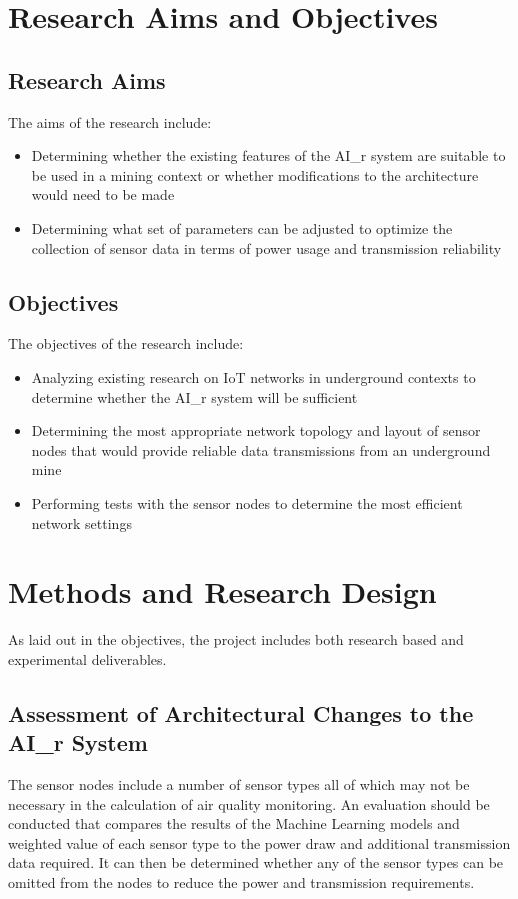 \documentclass[a4paper,twoside,12pt]{report}
\begin{document}
\section{Research Aims and Objectives}

\subsection{Research Aims}
The aims of the research include:
\begin{itemize}
    \item Determining whether the existing features of the AI\_r system are suitable to be used in a mining context or whether modifications to the architecture would need to be made
    \item Determining what set of parameters can be adjusted to optimize the collection of sensor data in terms of power usage and transmission reliability
\end{itemize}

\subsection{Objectives}
The objectives of the research include:
\begin{itemize}
    \item Analyzing existing research on IoT networks in underground contexts to determine whether the AI\_r system will be sufficient
    \item Determining the most appropriate network topology and layout of sensor nodes that would provide reliable data transmissions from an underground mine
    \item Performing tests with the sensor nodes to determine the most efficient network settings
\end{itemize}

\section{Methods and Research Design}
As laid out in the objectives, the project includes both research based and experimental deliverables.

\subsection{Assessment of Architectural Changes to the AI\_r System}
The sensor nodes include a number of sensor types all of which may not be necessary in the calculation of air quality monitoring. An evaluation should be conducted that compares the results of the Machine Learning models and weighted value of each sensor type to the power draw and additional transmission data required. It can then be determined whether any of the sensor types can be omitted from the nodes to reduce the power and transmission requirements.
\end{document}
